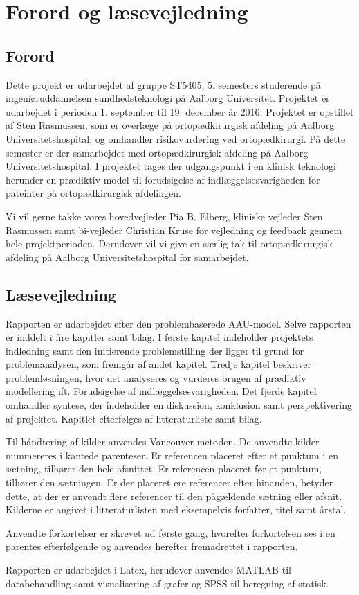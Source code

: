 \chapter*{Forord og læsevejledning}

\section*{Forord}
Dette projekt er udarbejdet af gruppe ST5405, 5. semesters studerende på ingeniøruddannelsen sundhedsteknologi på Aalborg Universitet. Projektet er udarbejdet i perioden 1. september til 19. december år 2016. Projektet er opstillet af Sten Rasmussen, som er overlæge på ortopædkirurgisk afdeling på Aalborg Universitetshospital, og omhandler risikovurdering ved ortopædkirurgi. På dette semester er der samarbejdet med ortopædkirurgisk afdeling på Aalborg Universitetshospital. I projektet tages der udgangspunkt i en klinisk teknologi herunder en prædiktiv model til forudsigelse af indlæggelsesvarigheden for pateinter på ortopædkirurgisk afdelingen. 


Vi vil gerne takke vores hovedvejleder Pia B. Elberg, kliniske vejleder Sten Rasmussen samt bi-vejleder Christian Kruse for vejledning og feedback gennem hele projektperioden. Derudover vil vi give en særlig tak til ortopædkirurgisk afdeling på Aalborg Universitetshospital for samarbejdet. 


\section*{Læsevejledning}
Rapporten er udarbejdet efter den problembaserede AAU-model. Selve rapporten er inddelt i fire kapitler samt bilag. I første kapitel indeholder projektets indledning samt den initierende problemstilling der ligger til grund for problemanalysen, som fremgår af andet kapitel. Tredje kapitel beskriver problemløsningen, hvor det analyseres og vurderes brugen af prædiktiv modellering ift. Forudsigelse af indlæggelsesvarigheden. Det fjerde kapitel omhandler syntese, der indeholder en diskussion, konklusion samt perspektivering af projektet. Kapitlet efterfølges af litteraturliste samt bilag. 


Til håndtering af kilder anvendes Vancouver-metoden. De anvendte kilder nummereres i kantede parenteser. Er referencen placeret efter et punktum i en sætning, tilhører den hele afsnittet. Er referencen placeret før et punktum, tilhører den sætningen. Er der placeret ere referencer efter hinanden, betyder dette, at der er anvendt flere referencer til den pågældende sætning eller afsnit. Kilderne er angivet i litteraturlisten med eksempelvis forfatter, titel samt årstal. 


Anvendte forkortelser er skrevet ud første gang, hvorefter forkortelsen ses i en parentes efterfølgende og anvendes herefter fremadrettet i rapporten. 


Rapporten er udarbejdet i Latex, herudover anvendes MATLAB til databehandling samt visualisering af grafer og SPSS til beregning af statisk. 
